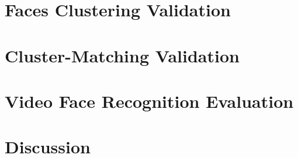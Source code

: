 \section{Faces Clustering Validation}
\label{sec:recognition_clustering_validation}

\section{Cluster-Matching Validation}
\label{sec:recognition_matching_validation}

\section{Video Face Recognition Evaluation}
\label{sec:recognition_video_evaluation}

\section{Discussion}
\label{sec:recognition_discussion}

